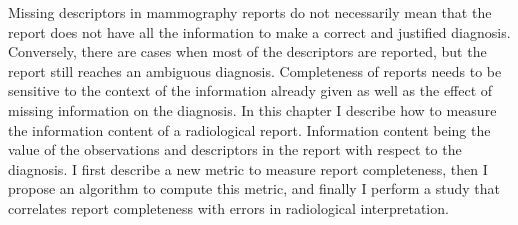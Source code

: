 Missing descriptors in mammography reports do not necessarily mean that the report does not have all the information to make a correct and justified diagnosis. Conversely, there are cases when most of the descriptors are reported, but the report still reaches an ambiguous diagnosis. Completeness of reports needs to be sensitive to the context of the information already given as well as the effect of missing information on the diagnosis. In this chapter I describe how to measure the information content of a radiological report. Information content being the value of the observations and descriptors in the report with respect to the diagnosis. I first describe a new metric to measure report completeness, then I propose an algorithm to compute this metric, and finally I perform a study that correlates report completeness with errors in radiological interpretation.